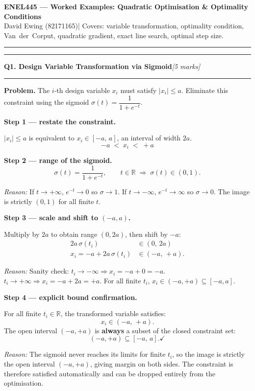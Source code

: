 \documentclass[10pt,a4paper]{article}
\newcommand{\sectitle}[2]{%
  \vspace{10pt}\noindent\rule{\linewidth}{0.8pt}\par\vspace{2pt}%
  {\large\textbf{#1}\hfill\normalsize\textit{[#2 marks]}}\par
  \vspace{2pt}\rule{\linewidth}{0.4pt}\vspace{4pt}}
\newcommand{\reason}[1]{%
  \begin{mdframed}[backgroundcolor=reasonbg, linewidth=0.4pt,
    innertopmargin=3pt, innerbottommargin=3pt,
    innerleftmargin=6pt, innerrightmargin=6pt]
    \small\textit{Reason:} \small #1
  \end{mdframed}\vspace{2pt}}
\begin{document}
\begin{center}
  {\large\textbf{ENEL445 --- Worked Examples: Quadratic Optimisation \& Optimality Conditions}}\\[3pt]
  {\small David Ewing (82171165)\quad|\quad
   Covers: variable transformation, optimality condition, Van~der~Corput,
   quadratic gradient, exact line search, optimal step size.}
\end{center}
\noindent\rule{\linewidth}{0.8pt}

\sectitle{Q1. Design Variable Transformation via Sigmoid}{5}

\noindent\textbf{Problem.} The $i$-th design variable $x_i$ must satisfy $|x_i|\le a$.
Eliminate this constraint using the sigmoid $\sigma(t)=\dfrac{1}{1+e^{-t}}$.

\vspace{6pt}
\textbf{Step 1 --- restate the constraint.}

$|x_i|\le a$ is equivalent to $x_i\in[-a,\,a]$, an interval of width $2a$.
\[
  -a \;<\; x_i \;<\; +a
\]

\textbf{Step 2 --- range of the sigmoid.}
\[
  \sigma(t)=\frac{1}{1+e^{-t}},\qquad t\in\mathbb{R}\;\Rightarrow\;\sigma(t)\in(0,1).
\]

\reason{If $t\to+\infty$, $e^{-t}\to 0$ so $\sigma\to 1$.
        If $t\to-\infty$, $e^{-t}\to\infty$ so $\sigma\to 0$.
        The image is strictly $(0,1)$ for all finite $t$.}

\textbf{Step 3 --- scale and shift to $(-a,a)$.}

Multiply by $2a$ to obtain range $(0,2a)$, then shift by $-a$:
\begin{align*}
  2a\,\sigma(t_i)             &\in (0,\,2a) \\
  x_i = -a + 2a\,\sigma(t_i) &\in (-a,\,+a).
\end{align*}

\reason{Sanity check: $t_i\to-\infty \Rightarrow x_i = -a+0 = -a$.
        $t_i\to+\infty \Rightarrow x_i = -a+2a = +a$.
        For all finite $t_i$, $x_i\in(-a,+a)\subseteq[-a,a]$. \checkmark}

\textbf{Step 4 --- explicit bound confirmation.}

For all finite $t_i\in\mathbb{R}$, the transformed variable satisfies:
\[
  x_i \in (-a,\,+a).
\]
The open interval $(-a,+a)$ is \textbf{always} a subset of the closed constraint set:
\[
  (-a,+a) \subseteq [-a,\,a]. \checkmark
\]
\reason{The sigmoid never reaches its limits for finite $t_i$, so the image is strictly
        the open interval $(-a,+a)$, giving margin on both sides. The constraint is
        therefore satisfied automatically and can be dropped entirely from the optimisation.}
\end{document}
